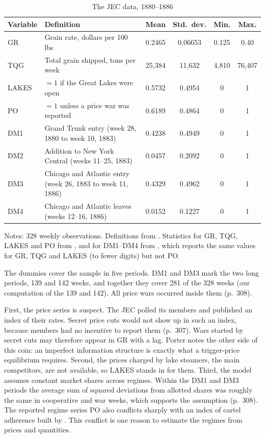 \begin{table}[htbp]
\centering
\caption{The JEC data, 1880--1886}\label{tab:13-jec-data}
\small
\begin{tabularx}{\textwidth}{@{}l>{\raggedright\arraybackslash}Xcccc@{}}
\toprule
Variable & Definition & Mean & Std.\ dev. & Min. & Max.\\
\midrule
GR & Grain rate, dollars per 100 lbs & 0.2465 & 0.06653 & 0.125 & 0.40\\
TQG & Total grain shipped, tons per week & 25{,}384 & 11{,}632 & 4{,}810 & 76{,}407\\
LAKES & $=1$ if the Great Lakes were open & 0.5732 & 0.4954 & 0 & 1\\
PO & $=1$ unless a price war was reported & 0.6189 & 0.4864 & 0 & 1\\
DM1 & Grand Trunk entry (week 28, 1880 to week 10, 1883) & 0.4238 & 0.4949 & 0 & 1\\
DM2 & Addition to New York Central (weeks 11--25, 1883) & 0.0457 & 0.2092 & 0 & 1\\
DM3 & Chicago and Atlantic entry (week 26, 1883 to week 11, 1886) & 0.4329 & 0.4962 & 0 & 1\\
DM4 & Chicago and Atlantic leaves (weeks 12--16, 1886) & 0.0152 & 0.1227 & 0 & 1\\
\bottomrule
\end{tabularx}

\smallskip
\begin{minipage}{0.95\textwidth}\footnotesize
Notes: 328 weekly observations. Definitions from \citet[Table~1]{Porter1983}. Statistics for GR, TQG, LAKES and PO
from \citet[Table~2]{Porter1983}, and for DM1--DM4 from \citet[Table~1]{Ellison1994}, which reports the same values
for GR, TQG and LAKES (to fewer digits) but not PO.
\end{minipage}
\end{table}

The dummies cover the sample in five periods. DM1 and DM3 mark the two long periods, 139 and 142 weeks, and together
they cover 281 of the 328 weeks (our computation of the 139 and 142). All price wars occurred inside them (p.~308).

First, the price series is suspect. The JEC polled its members and published an index of their rates. Secret price
cuts would not show up in such an index, because members had no incentive to report them (p.~307). Wars started by
secret cuts may therefore appear in GR with a lag. Porter notes the other side of this coin: an imperfect information
structure is exactly what a trigger-price equilibrium requires. Second, the prices charged by lake steamers, the main
competitors, are not available, so LAKES stands in for them. Third, the model assumes constant market shares across
regimes. Within the DM1 and DM3 periods the average sum of squared deviations from allotted shares was roughly the
same in cooperative and war weeks, which supports the assumption (p.~308). The reported regime series PO also
conflicts sharply with an index of cartel adherence built by \citet{MacAvoy1965}. This conflict is one reason to
estimate the regimes from prices and quantities.

